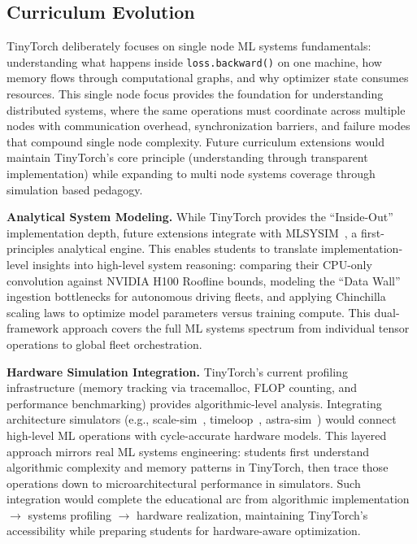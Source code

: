 \documentclass[10pt,twocolumn]{article}
\begin{document}
\subsection{Curriculum Evolution}

TinyTorch deliberately focuses on single node ML systems fundamentals: understanding what happens inside \texttt{loss.backward()} on one machine, how memory flows through computational graphs, and why optimizer state consumes resources. This single node focus provides the foundation for understanding distributed systems, where the same operations must coordinate across multiple nodes with communication overhead, synchronization barriers, and failure modes that compound single node complexity. Future curriculum extensions would maintain TinyTorch's core principle (understanding through transparent implementation) while expanding to multi node systems coverage through simulation based pedagogy.

\textbf{Analytical System Modeling.} While TinyTorch provides the ``Inside-Out'' implementation depth, future extensions integrate with MLSYSIM~\citep{mlsysim2025}, a first-principles analytical engine. This enables students to translate implementation-level insights into high-level system reasoning: comparing their CPU-only convolution against NVIDIA H100 Roofline bounds, modeling the ``Data Wall'' ingestion bottlenecks for autonomous driving fleets, and applying Chinchilla scaling laws to optimize model parameters versus training compute. This dual-framework approach covers the full ML systems spectrum from individual tensor operations to global fleet orchestration.

\textbf{Hardware Simulation Integration.} TinyTorch's current profiling infrastructure (memory tracking via tracemalloc, FLOP counting, and performance benchmarking) provides algorithmic-level analysis. Integrating architecture simulators (e.g., scale-sim~\citep{samajdar2018scale}, timeloop~\citep{parashar2019}, astra-sim~\citep{won2023}) would connect high-level ML operations with cycle-accurate hardware models.
 This layered approach mirrors real ML systems engineering: students first understand algorithmic complexity and memory patterns in TinyTorch, then trace those operations down to microarchitectural performance in simulators. Such integration would complete the educational arc from algorithmic implementation $\rightarrow$ systems profiling $\rightarrow$ hardware realization, maintaining TinyTorch's accessibility while preparing students for hardware-aware optimization.
\end{document}
